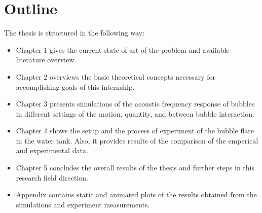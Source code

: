 \section{Outline}
The thesis is structured in the following way:
\begin{itemize}
    \item Chapter 1 gives the current state of art of the problem and available literature overview.
    \item Chapter 2 overviews the basic theoretical concepts necessary for accomplishing goals of this internship.
    \item Chapter 3 presents simulations of the acoustic frequency response of bubbles in different settings of the motion, quantity, and between bubble interaction. 
    \item Chapter 4 shows the setup and the process of experiment of the bubble flare in the water tank. Also, it provides results of the comparison of the emperical and experimental data.
    \item Chapter 5 concludes the overall results of the thesis and further steps in this research field direction.
    \item Appendix contains static and animated plots of the results obtained from the simulations and experiment measurements.  
\end{itemize}